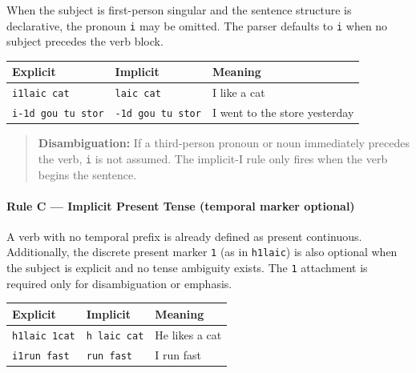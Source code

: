 When the subject is first-person singular and the sentence structure is
declarative, the pronoun \texttt{i} may be omitted. The parser defaults
to \texttt{i} when no subject precedes the verb block.

{\def\LTcaptype{} %
\begin{longtable}[]{@{}
  >{\raggedright\arraybackslash}p{}
  >{\raggedright\arraybackslash}p{}
  >{\raggedright\arraybackslash}p{}@{}}
\toprule\noalign{}
\begin{minipage}[b]{\linewidth}\raggedright
Explicit
\end{minipage} & \begin{minipage}[b]{\linewidth}\raggedright
Implicit
\end{minipage} & \begin{minipage}[b]{\linewidth}\raggedright
Meaning
\end{minipage} \\
\midrule\noalign{}
\endhead
\bottomrule\noalign{}
\endlastfoot
\texttt{i1laic\ cat} & \texttt{laic\ cat} & I like a cat \\
\texttt{i-1d\ gou\ tu\ stor} & \texttt{-1d\ gou\ tu\ stor} & I went to
the store yesterday \\
\end{longtable}
}

\begin{quote}
\textbf{Disambiguation:} If a third-person pronoun or noun immediately
precedes the verb, \texttt{i} is not assumed. The implicit-I rule only
fires when the verb begins the sentence.
\end{quote}

\paragraph{Rule C --- Implicit Present Tense (temporal marker
optional)}\label{rule-c-implicit-present-tense-temporal-marker-optional}

A verb with no temporal prefix is already defined as present continuous.
Additionally, the discrete present marker \texttt{1} (as in
\texttt{h1laic}) is also optional when the subject is explicit and no
tense ambiguity exists. The \texttt{1} attachment is required only for
disambiguation or emphasis.

{\def\LTcaptype{} %
\begin{longtable}[]{@{}lll@{}}
\toprule\noalign{}
Explicit & Implicit & Meaning \\
\midrule\noalign{}
\endhead
\bottomrule\noalign{}
\endlastfoot
\texttt{h1laic\ 1cat} & \texttt{h\ laic\ cat} & He likes a cat \\
\texttt{i1run\ fast} & \texttt{run\ fast} & I run fast \\
\end{longtable}
}

